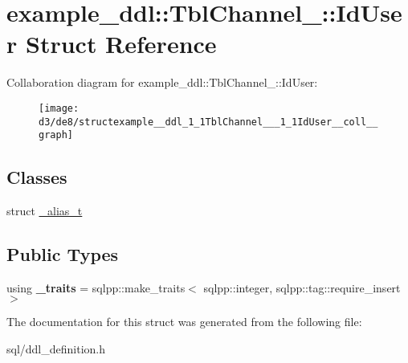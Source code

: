 \hypertarget{structexample__ddl_1_1TblChannel___1_1IdUser}{}\section{example\+\_\+ddl\+:\+:Tbl\+Channel\+\_\+\+:\+:Id\+User Struct Reference}
\label{structexample__ddl_1_1TblChannel___1_1IdUser}


Collaboration diagram for example\+\_\+ddl\+:\+:Tbl\+Channel\+\_\+\+:\+:Id\+User\+:
\nopagebreak
\begin{figure}[H]
\begin{center}
\leavevmode
\texttt{[image: d3/de8/structexample\_\_ddl\_1\_1TblChannel\_\_\_1\_1IdUser\_\_coll\_\_graph]}
\end{center}
\end{figure}
\subsection*{Classes}
\begin{DoxyCompactItemize}
\item 
struct \hyperlink{structexample__ddl_1_1TblChannel___1_1IdUser_1_1__alias__t}{\+\_\+alias\+\_\+t}
\end{DoxyCompactItemize}
\subsection*{Public Types}
\begin{DoxyCompactItemize}
\item 
\hypertarget{structexample__ddl_1_1TblChannel___1_1IdUser_a6958272ecff26c28ab8b6700d8bb52b2}{}using {\bfseries \+\_\+traits} = sqlpp\+::make\+\_\+traits$<$ sqlpp\+::integer, sqlpp\+::tag\+::require\+\_\+insert $>$\label{structexample__ddl_1_1TblChannel___1_1IdUser_a6958272ecff26c28ab8b6700d8bb52b2}

\end{DoxyCompactItemize}


The documentation for this struct was generated from the following file\+:\begin{DoxyCompactItemize}
\item 
sql/ddl\+\_\+definition.\+h\end{DoxyCompactItemize}
